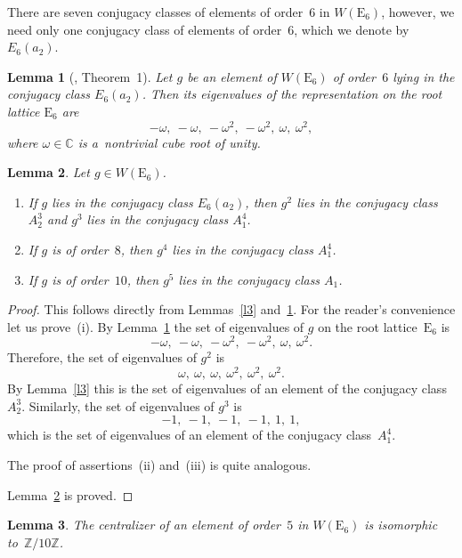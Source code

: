 \documentclass{amsart}
\numberwithin{equation}{section}
\theoremstyle{plain}
\newtheorem{lemma}{Lemma}
\theoremstyle{definition}
\theoremstyle{remark}
\begin{document}
There are seven conjugacy classes of elements of order~$6$ in $W(\mathrm{E}_6)$, however, we need only one
conjugacy class of elements of order~$6$, which we denote by $E_6(a_2)$. 

\begin{lemma}[{\cite{17}, Theorem~1}]
\label{l4}
Let $g$ be an element of $W(\mathrm{E}_6)$ of order~$6$ lying in the conjugacy class $E_6(a_2)$. Then its eigenvalues of the representation on the root lattice $\mathrm{E}_6$ are
$$
-\omega,\ -\omega,\ -\omega^2,\ -\omega^2,\ \omega,\ \omega^2,
$$
where $\omega \in \mathbb{C}$ is a~nontrivial cube root of unity.
\end{lemma}

\begin{lemma}
\label{l5}
Let $g \in W(\mathrm{E}_6)$.
\begin{enumerate}
\item[{\rm (i)}] If $g$ lies in the conjugacy class $E_6(a_2)$, then $g^2$ lies in the conjugacy class~$A_2^3$ and $g^3$ lies in the conjugacy class $A_1^4$.

\item[{\rm (ii)}] If $g$ is of order~$8$, then $g^4$ lies in the conjugacy class $A_1^4$.

\item[{\rm (iii)}] If $g$ is of order~$10$, then $g^5$ lies in the conjugacy class $A_1$.
\end{enumerate}
\end{lemma}

\begin{proof}
This follows directly from Lemmas~\ref{l3} and~\ref{l4}. For the reader's convenience let us prove~(i). By
Lemma~\ref{l4} the set of eigenvalues of $g$ on the root lattice~$\mathrm{E}_6$ is
$$
-\omega,\ -\omega,\ -\omega^2,\ -\omega^2,\ \omega,\ \omega^2.
$$
Therefore, the set of eigenvalues of $g^2$ is
$$
\omega,\ \omega,\ \omega,\ \omega^2,\ \omega^2,\ \omega^2.
$$
By Lemma~\ref{l3} this is the set of eigenvalues of an element of the conjugacy class~$A_2^3$.
Similarly, the set of eigenvalues of $g^3$ is
$$
-1,\ -1,\ -1,\ -1,\ 1,\ 1,
$$
which is the set of eigenvalues of an element of the conjugacy class~$A_1^4$.

The proof of assertions~(ii) and~(iii) is quite analogous.

Lemma~\ref{l5} is proved.
\end{proof}

\begin{lemma}
\label{l6}
 The centralizer of an element of order~$5$ in $W(\mathrm{E}_6)$ is isomorphic to~$\mathbb{Z}/10\mathbb{Z}$.
\end{lemma}
\end{document}
